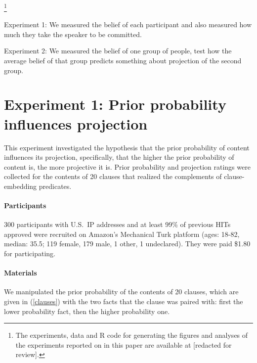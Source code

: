 \documentclass[11pt,fleqn]{article}
\newcommand{\6}{\mbox{$[\hspace*{-.6mm}[$}}
\newcommand{\9}{\mbox{$]\hspace*{-.6mm}]$}}
\begin{document}
\footnote{\label{f-github}The experiments, data and R code for generating the figures and analyses of the experiments reported on in this paper are available at [redacted for review].}

Experiment 1: We measured the belief of each participant and also measured how much they take the speaker to be committed.

Experiment 2: We measured the belief of one group of people, test how the average belief of that group predicts something about projection of the second group.

\newpage



\newpage

\section{Experiment 1: Prior probability influences projection}

This experiment investigated the hypothesis that the prior probability of content influences its projection, specifically, that the higher the prior probability of content is, the more projective it is. Prior probability and projection ratings were collected for the contents of 20 clauses that realized the complements of clause-embedding predicates. 

\paragraph{Participants} 300 participants with U.S.\ IP addresses and at least 99\% of previous HITs approved were recruited on Amazon's Mechanical Turk platform (ages: 18-82, median: 35.5; 119 female, 179 male, 1 other, 1 undeclared). They were paid \$1.80 for participating.

\paragraph{Materials} We manipulated the prior probability of the contents of 20 clauses, which are given in (\ref{clauses}) with the two facts that the clause was paired with: first the lower probability fact, then the higher probability one.
\end{document}
